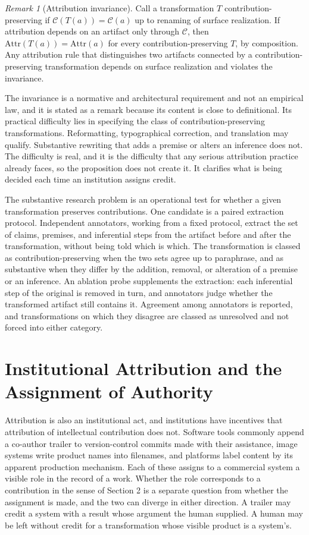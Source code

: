 \documentclass[12pt]{article}
\theoremstyle{definition}
\theoremstyle{remark}
\newtheorem{remark}{Remark}
\begin{document}
\begin{remark}[Attribution invariance]
\label{prop:attrib}
Call a transformation $T$ contribution-preserving if $\mathcal C(T(a))=\mathcal C(a)$ up to renaming of surface realization. If attribution depends on an artifact only through $\mathcal C$, then $\mathrm{Attr}(T(a))=\mathrm{Attr}(a)$ for every contribution-preserving $T$, by composition. Any attribution rule that distinguishes two artifacts connected by a contribution-preserving transformation depends on surface realization and violates the invariance.
\end{remark}

The invariance is a normative and architectural requirement and not an empirical law, and it is stated as a remark because its content is close to definitional. Its practical difficulty lies in specifying the class of contribution-preserving transformations. Reformatting, typographical correction, and translation may qualify. Substantive rewriting that adds a premise or alters an inference does not. The difficulty is real, and it is the difficulty that any serious attribution practice already faces, so the proposition does not create it. It clarifies what is being decided each time an institution assigns credit.

The substantive research problem is an operational test for whether a given transformation preserves contributions. One candidate is a paired extraction protocol. Independent annotators, working from a fixed protocol, extract the set of claims, premises, and inferential steps from the artifact before and after the transformation, without being told which is which. The transformation is classed as contribution-preserving when the two sets agree up to paraphrase, and as substantive when they differ by the addition, removal, or alteration of a premise or an inference. An ablation probe supplements the extraction: each inferential step of the original is removed in turn, and annotators judge whether the transformed artifact still contains it. Agreement among annotators is reported, and transformations on which they disagree are classed as unresolved and not forced into either category.

\section{Institutional Attribution and the Assignment of Authority}

Attribution is also an institutional act, and institutions have incentives that attribution of intellectual contribution does not. Software tools commonly append a co-author trailer to version-control commits made with their assistance, image systems write product names into filenames, and platforms label content by its apparent production mechanism. Each of these assigns to a commercial system a visible role in the record of a work. Whether the role corresponds to a contribution in the sense of Section 2 is a separate question from whether the assignment is made, and the two can diverge in either direction. A trailer may credit a system with a result whose argument the human supplied. A human may be left without credit for a transformation whose visible product is a system's.
\end{document}

